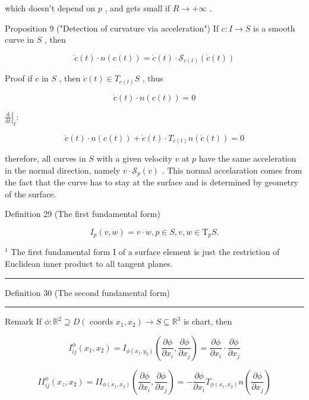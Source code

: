 \documentclass[lang=cn,a4paper,11pt,openany,twoside]{elegantbook}
\newcommand{\HRule}{\begin{center}\rule{0.9\linewidth}{0.2mm}\end{center}}
\begin{document}
which doesn’t depend on \(p\) , and gets small if \(R \rightarrow   + \infty\) .

Proposition 9 ("Detection of curvature via acceleration") If \(c : I \rightarrow  S\) is a smooth curve in \(S\) , then

\[
\ddot{c}\left( t\right)  \cdot  n\left( {c\left( t\right) }\right)  = \dot{c}\left( t\right)  \cdot  {\mathcal{S}}_{c\left( t\right) }\left( {\dot{c}\left( t\right) }\right)
\]

Proof if \(c\) in \(S\) , then \(\dot{c}\left( t\right)  \in  {T}_{c\left( t\right) }S\) , thus

\[
\dot{c}\left( t\right)  \cdot  n\left( {c\left( t\right) }\right)  = 0
\]

\({\left. \frac{\mathrm{d}}{\mathrm{d}t}\right| }_{t} :\)

\[
\ddot{c}\left( t\right)  \cdot  n\left( {c\left( t\right) }\right)  + \dot{c}\left( t\right)  \cdot  {T}_{c\left( t\right) }n\left( {\dot{c}\left( t\right) }\right)  = 0
\]

therefore, all curves in \(S\) with a given velocity \(v\) at \(p\) have the same acceleration in the normal direction, namely \(v \cdot  {\mathcal{S}}_{p}\left( v\right)\) . This normal accelaration comes from the fact that the curve has to stay at the surface and is determined by geometry of the surface.

Definition 29 (The first fundamental form)

\[
{I}_{p}\left( {v,w}\right)  = v \cdot  w,p \in  S,v,w \in  {\mathrm{T}}_{p}S.
\]

\({}^{1}\) The first fundamental form I of a surface element is just the restriction of Euclidean inner product to all tangent planes.

\HRule

Definition 30 (The second fundamental form)

\HRule

Remark If \(\phi  : {\mathbb{R}}^{2} \supseteq  D\left( {\text{ coords }{x}_{1},{x}_{2}}\right)  \rightarrow  S \subseteq  {\mathbb{R}}^{3}\) is chart, then

\[
{I}_{ij}^{\phi }\left( {{x}_{1},{x}_{2}}\right)  = {I}_{\phi \left( {{x}_{1},{y}_{2}}\right) }\left( {\frac{\partial \phi }{\partial {x}_{i}},\frac{\partial \phi }{\partial {x}_{j}}}\right)  = \frac{\partial \phi }{\partial {x}_{i}} \cdot  \frac{\partial \phi }{\partial {x}_{j}}
\]

\[
I{I}_{ij}^{\phi }\left( {{x}_{z},{x}_{2}}\right)  = I{I}_{\phi \left( {{x}_{1},{x}_{2}}\right) }\left( {\frac{\partial \phi }{\partial {x}_{i}},\frac{\partial \phi }{\partial {x}_{j}}}\right)  =  - \frac{\partial \phi }{\partial {x}_{i}}{T}_{\phi \left( {{x}_{1},{x}_{2}}\right) }n\left( \frac{\partial \phi }{\partial {x}_{j}}\right)
\]
\end{document}
